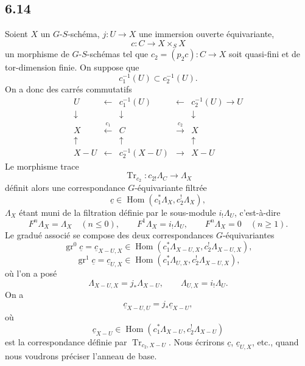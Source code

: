 \documentclass[11pt]{article}
\DeclareMathOperator{\Hom}{Hom}
\providecommand{\Tr}{\operatorname{Tr}}
\providecommand{\Tr}{\operatorname{Tr}}
\providecommand{\Tr}{\operatorname{Tr}}
\providecommand{\Hom}{\operatorname{Hom}}
\providecommand{\Tr}{\operatorname{Tr}}
\begin{document}
\subsection*{6.14}
Soient $X$ un $G$-$S$-schéma, $j:U\to X$ une immersion ouverte équivariante,
\[
c:C\to X\times_SX
\]
un morphisme de $G$-$S$-schémas tel que $c_2=(p_2c):C\to X$ soit quasi-fini et de tor-dimension finie. On suppose que
\[
c_1^{-1}(U)\subset c_2^{-1}(U).
\]
On a donc des carrés commutatifs
\begin{equation}
\begin{array}{ccccc}
U & \longleftarrow & c_1^{-1}(U) & \longleftarrow & c_2^{-1}(U)\longrightarrow U\\
\downarrow && \downarrow && \downarrow\\
X & \xleftarrow{\,c_1\,} & C & \xrightarrow{\,c_2\,} & X\\
\uparrow && \uparrow && \uparrow\\
X-U & \longleftarrow & c_2^{-1}(X-U) & \longrightarrow & X-U
\end{array}
\tag{6.14.1}
\end{equation}
Le morphisme trace
\[
\Tr_{c_2}:c_{2!}\Lambda_C\longrightarrow \Lambda_X
\]
définit alors une correspondance $G$-équivariante filtrée
\begin{equation}
\underline c\in\Hom(c_1^*\Lambda_X,c_2^!\Lambda_X),
\tag{6.14.2}
\end{equation}
$\Lambda_X$ étant muni de la filtration définie par le sous-module $i_!\Lambda_U$, c'est-à-dire
\[
F^n\Lambda_X=\Lambda_X\quad(n\le0),\qquad
F^1\Lambda_X=i_!\Lambda_U,\qquad
F^n\Lambda_X=0\quad(n\ge1).
\]
Le gradué associé se compose des deux correspondances $G$-équivariantes
\[
\operatorname{gr}^0\underline c=\underline c_{X-U,X}
\in\Hom(c_1^*\Lambda_{X-U,X},c_2^!\Lambda_{X-U,X}),
\]
\begin{equation}
\operatorname{gr}^1\underline c=\underline c_{U,X}
\in\Hom(c_1^*\Lambda_{U,X},c_2^!\Lambda_{X-U,X}),
\tag{6.14.3}
\end{equation}
où l'on a posé
\[
\Lambda_{X-U,X}=j_*\Lambda_{X-U},\qquad
\Lambda_{U,X}=i_!\Lambda_U.
\]
On a
\begin{equation}
\underline c_{X-U,U}=j_*\underline c_{X-U},
\tag{6.14.4}
\end{equation}
où
\[
\underline c_{X-U}\in\Hom(c_1^*\Lambda_{X-U},c_2^!\Lambda_{X-U})
\]
est la correspondance définie par $\Tr_{c_2,X-U}$. Nous écrirons $\underline c$, $\underline c_{U,X}$, etc., quand nous voudrons préciser l'anneau de base.
\end{document}
